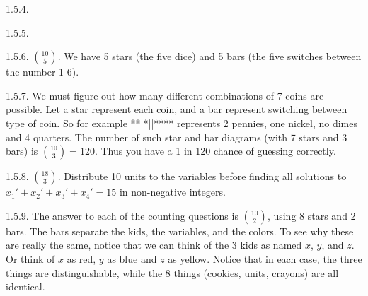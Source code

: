 \begin {itemize}
\begin{ans}{1.5.4.}
\end{ans}
\begin{ans}{1.5.5.}
	
\end{ans}
\begin{ans}{1.5.6.}
	${10 \choose 5}$.  We have 5 stars (the five dice) and 5 bars (the five switches between the number 1-6).
	
\end{ans}
\begin{ans}{1.5.7.}
	 We must figure out how many different combinations of 7 coins are possible.  Let a star represent each coin, and a bar represent switching between type of coin.  So for example **|*||**** represents 2 pennies, one nickel, no dimes and 4 quarters.  The number of such star and bar diagrams (with 7 stars and 3 bars) is ${10 \choose 3} = 120$.  Thus you have a 1 in 120 chance of guessing correctly.
	
\end{ans}
\begin{ans}{1.5.8.}
	${18 \choose 3}$.  Distribute 10 units to the variables before finding all solutions to $x_1' + x_2' + x_3' + x_4' = 15$ in non-negative integers.
	
\end{ans}
\begin{ans}{1.5.9.}
	  The answer to each of the counting questions is ${10 \choose 2}$, using 8 stars and 2 bars.  The bars separate the kids, the variables, and the colors.  To see why these are really the same, notice that we can think of the 3 kids as named $x$, $y$, and $z$.  Or think of $x$ as red, $y$ as blue and $z$ as yellow.  Notice that in each case, the three things are distinguishable, while the 8 things (cookies, units, crayons) are all identical.
	

\end{ans}
\end{itemize}
